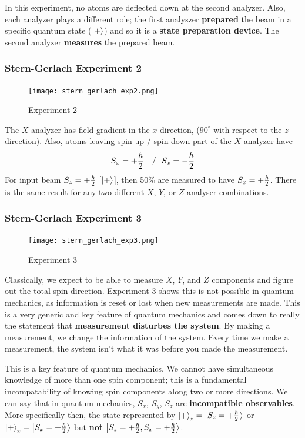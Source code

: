 \documentclass[english, 11pt]{article}
\begin{document}
         In this experiment, no atoms are deflected down at the second analyzer. Also, each analyzer plays a different role; the first analyszer \textbf{prepared} the beam in a specific quantum state ($\left|+\right\rangle$) and so it is a \textbf{state preparation device}. The second analyzer \textbf{measures} the prepared beam.

       \subsubsection{Stern-Gerlach Experiment 2}

         \begin{figure}[t!]
            \centering
            \texttt{[image: stern\_gerlach\_exp2.png]}
            \caption{Experiment 2}
         \end{figure}

         The $X$ analyzer has field gradient in the $x$-direction, ($90^{\circ}$ with respect to the $z$-direction). Also, atoms leaving spin-up / spin-down part of the $X$-analyzer have
         \[ S_x = + \frac{\hbar}{2} \ \ \ / \ \ S_x = - \frac{\hbar}{2} \]
         For input beam $S_z = + \frac{\hbar}{2}$ [$\left|+\right\rangle$], then 50\% are measured to have $S_x = +\frac{\hbar}{2}$. There is the same result for any two different $X$, $Y$, or $Z$ analyser combinations.

       \subsubsection{Stern-Gerlach Experiment 3}

         \begin{figure}[b!]
            \centering
            \texttt{[image: stern\_gerlach\_exp3.png]}
            \caption{Experiment 3}
         \end{figure}

         Classically, we expect to be able to measure $X$, $Y$, and $Z$ components and figure out the total spin direction.  Experiment 3 shows this is not possible in quantum mechanics, as information is reset or lost when new measurements are made. This is a very generic and key feature of quantum mechanics and comes down to really the statement that \textbf{measurement disturbes the system}. By making a measurement, we change the information of the system. Every time we make a measurement, the system isn't what it was before you made the measurement.
         \newline

         This is a key feature of quantum mechanics. We cannot have simultaneous knowledge of more than one spin component; this is a fundamental incompatability of knowing spin components along two or more directions. We can say that in quantum mechanics, $S_x$, $S_y$, $S_z$ are \textbf{incompatible observables}. More specifically then, the state represented by $\left|+\right\rangle_z = \left|S_z = +\frac{\hbar}{2}\right\rangle$ or $\left|+\right\rangle_x = \left|S_x = + \frac{\hbar}{2}\right\rangle$ but \textbf{not} $\left|S_z = +\frac{\hbar}{2}, S_x = + \frac{\hbar}{2}\right\rangle$.
\end{document}
